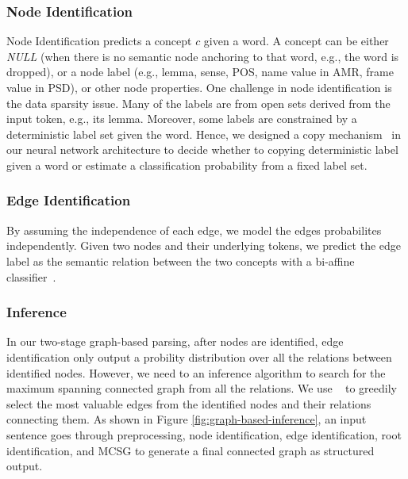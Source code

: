 \subsubsection{Node Identification}
\label{ssec:node_ident}
Node Identification predicts a concept $c$ given a word. A
concept can be either {\it NULL} (when there is no semantic node
anchoring to that word, e.g., the word is dropped), or a node label
(e.g., lemma, sense, POS, name value in AMR, frame value in PSD), or
other node properties. One challenge in node identification is the
data sparsity issue. Many of the labels are from open sets derived
from the input token, e.g., its lemma.  Moreover, some labels are
constrained by a deterministic label set given the word. Hence, we
designed a copy mechanism~\cite{luong2014addressing} in our neural
network architecture to decide whether to copying deterministic label
given a word or estimate a classification probability from a fixed
label set.


\subsubsection{Edge Identification}
\label{ssec:edge_ident}

By assuming the independence of each edge, we model the edges
probabilites independently.  Given two nodes and their underlying
tokens, we predict the edge label as the semantic relation between the
two concepts with a bi-affine classifier~\cite{dozat2016deep}.

\subsubsection{Inference}
In our two-stage graph-based parsing, after nodes are identified, edge
identification only output a probility distribution over all the
relations between identified nodes. However, we need to an inference
algorithm to search for the maximum spanning connected graph from all
the relations. We use ~\citet[MSCG,][]{Flanigan:2014vc} to greedily
select the most valuable edges from the identified nodes and their
relations connecting them. As shown in Figure
\ref{fig:graph-based-inference}, an input sentence goes through
preprocessing, node identification, edge identification, root
identification, and MCSG to generate a final connected graph as
structured output.

